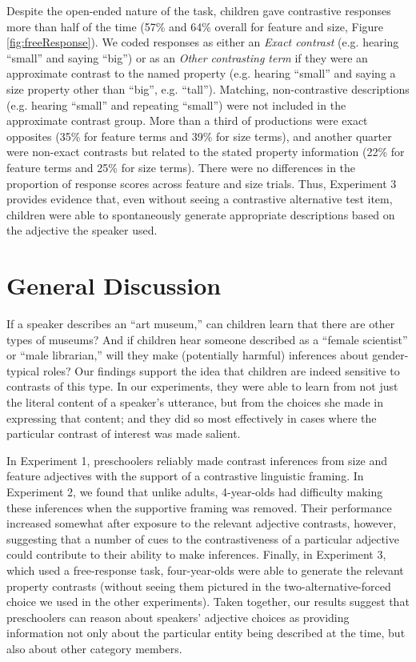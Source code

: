 \documentclass[man]{apa2}
\begin{document}
Despite the open-ended nature of the task, children gave contrastive responses more than half of the time (57\% and 64\% overall for feature and size, Figure \ref{fig:freeResponse}).  We coded responses as either an \emph{Exact contrast} (e.g. hearing ``small'' and saying ``big'') or as an \emph{Other contrasting term} if they were an approximate contrast to the named property (e.g. hearing ``small'' and saying a size property other than ``big'', e.g. ``tall''). Matching, non-contrastive descriptions (e.g. hearing ``small'' and repeating ``small'') were not included in the approximate contrast group. More than a third of productions were exact opposites (35\% for feature terms and 39\% for size terms), and another quarter were non-exact contrasts but related to the stated property information (22\% for feature terms and 25\% for size terms). There were no differences in the proportion of response scores across feature and size trials. Thus, Experiment 3 provides evidence that, even without seeing a contrastive alternative test item, children were able to spontaneously generate appropriate descriptions based on the adjective the speaker used.  

\section{General Discussion}

If a speaker describes an ``art museum,'' can children learn that there are other types of museums? And if children hear someone described as a ``female scientist'' or ``male librarian,'' will they make (potentially harmful) inferences about gender-typical roles? Our findings support the idea that children are indeed sensitive to contrasts of this type. In our experiments, they were able to learn from not just the literal content of a speaker's utterance, but from the choices she made in expressing that content; and they did so most effectively in cases where the particular contrast of interest was made salient.

In Experiment 1, preschoolers reliably made contrast inferences from size and feature adjectives with the support of a contrastive linguistic framing.  In Experiment 2, we found that unlike adults, 4-year-olds had difficulty making these inferences when the supportive framing was removed. Their performance increased somewhat after exposure to the relevant adjective contrasts, however, suggesting that a number of cues to the contrastiveness of a particular adjective could contribute to their ability to make inferences. Finally, in Experiment 3, which used a free-response task, four-year-olds were able to generate the relevant property contrasts (without seeing them pictured in the two-alternative-forced choice we used in the other experiments). Taken together, our results suggest that preschoolers can reason about speakers' adjective choices as providing information not only about the particular entity being described at the time, but also about other category members. 
\end{document}
